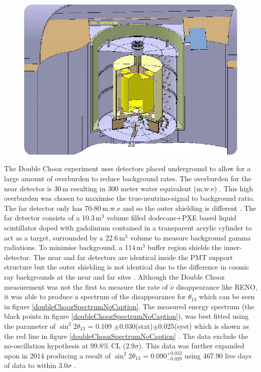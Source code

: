 \begin{figure}[!h]
 \centering
 \includegraphics[width=0.5\linewidth]{Chapter1/Figs/Raster/doublChoozDetectorDiagram.png} %
 \label{fig:DoubleChoozFarDetector}
\end{figure}
The Double Chooz experiment uses detectors placed underground to allow for a large amount of overburden to reduce background rates. The overburden for the near detector is 30\,m resulting in 300 meter water equivalent (m.w.e) \cite{lasserre2006}. This high overburden was chosen to maximise the true-neutrino-signal to background ratio. The far detector only has 70-80\,m.w.e and so the outer shielding is different \cite{lasserre2006}. The far detector consists of a 10.3\,m$^3$ volume filled dodecane+PXE based liquid scintillator doped with gadolinium contained in a transparent acrylic cylinder to act as a target, surrounded by a 22.6\,m$^3$ volume to measure background gamma radiations. To minimise background, a 114\,m$^3$ buffer region shields the inner-detector. The near and far detectors are identical inside the PMT support structure but the outer shielding is not identical due to the difference in cosmic ray backgrounds at the near and far sites \cite{lasserre2006}. Although the Double Chooz measurement  was not the first to measure the rate of $\bar{\nu}$ disappearance \cite{reno_may_2012} like RENO, it was able to produce a spectrum of the disappearance for $\theta_{13}$ which can be seen in figure \ref{doubleChoozSpectrumNoCaption}. The measured energy spectrum (the black points in figure \ref{doubleChoozSpectrumNoCaption}), was best fitted using the parameter of $\sin^2{2\theta_{13}}$ = 0.109 $\pm$0.030(stat)$\pm$0.025(syst) which is shown as the red line in figure \ref{doubleChoozSpectrumNoCaption} \cite{Abe_2012}. The data exclude the no-oscillation hypothesis at 99.8$\%$ CL (2.9$\sigma$)\cite{Abe_2012}. This data was further expanded upon in 2014 producing a result of $\sin^2{2\theta_{13}}$ = 0.090$^{+0.032}_{-0.029}$ using 467.90 live days of data to within $3.0\sigma$ \cite{abe2014improved}.
